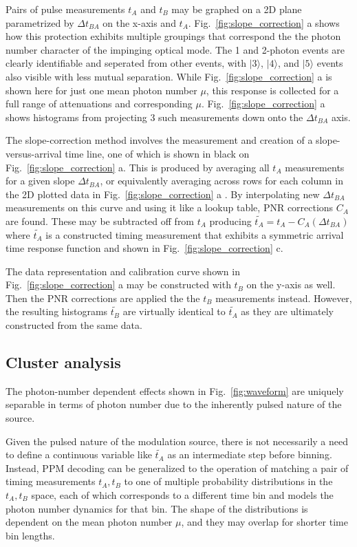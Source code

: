\documentclass[11pt]{caltech_thesis} %
\begin{document}
Pairs of pulse measurements $t_A$ and $t_B$ may be graphed on a 2D plane parametrized by $\Delta t_{BA}$ on the x-axis and $t_A$. Fig.~\ref{fig:slope_correction} a shows how this protection exhibits multiple groupings that correspond the the photon number character of the impinging optical mode. The 1 and 2-photon events are clearly identifiable and seperated from other events, with $|3\rangle$, $|4\rangle$, and $|5\rangle$ events also visible with less mutual separation. While Fig.~\ref{fig:slope_correction} a is shown here for just one mean photon number $\mu$, this response is collected for a full range of attenuations and corresponding $\mu$. Fig.~\ref{fig:slope_correction} a shows histograms from projecting 3 such measurements down onto the $\Delta t_{BA}$ axis.

The slope-correction method involves the measurement and creation of a slope-versus-arrival time line, one of which is shown in black on Fig.~\ref{fig:slope_correction} a. This is produced by averaging all $t_A$ measurements for a given slope $\Delta t_{BA}$, or equivalently averaging across rows for each column in the 2D plotted data in Fig.~\ref{fig:slope_correction} a . By interpolating new $\Delta t_{BA}$ measurements on this curve and using it like a lookup table, PNR corrections $C_A$ are found. These may be subtracted off from $t_A$ producing $\tilde{t_A} = t_A - C_A(\Delta t_{BA})$ where $\tilde{t_A}$ is a constructed timing measurement that exhibits a symmetric arrival time response function and shown in Fig.~\ref{fig:slope_correction} c.~

The data representation and calibration curve shown in Fig.~\ref{fig:slope_correction} a may be constructed with $t_B$ on the y-axis as well. Then the PNR corrections are applied the the $t_B$ measurements instead. However, the resulting histograms $\tilde{t_B}$ are virtually identical to $\tilde{t_A}$ as they are ultimately constructed from the same data.

\hypertarget{cluster-analysis}{%
\subsection{Cluster analysis}\label{cluster-analysis}}

The photon-number dependent effects shown in Fig.~\ref{fig:waveform} are uniquely separable in terms of photon number due to the inherently pulsed nature of the source.

Given the pulsed nature of the modulation source, there is not necessarily a need to define a continuous variable like $\tilde{t_A}$ as an intermediate step before binning. Instead, PPM decoding can be generalized to the operation of matching a pair of timing measurements $t_A, t_B$ to one of multiple probability distributions in the $t_A, t_B$ space, each of which corresponds to a different time bin and models the photon number dynamics for that bin. The shape of the distributions is dependent on the mean photon number $\mu$, and they may overlap for shorter time bin lengths.
\end{document}

